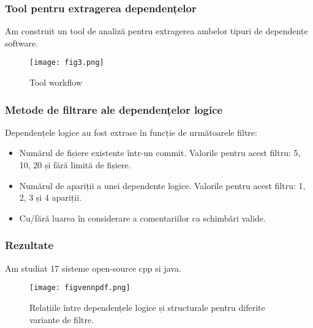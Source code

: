 \documentclass{beamer}
\begin{document}

 \begin{frame}
\frametitle{Tool pentru extragerea dependențelor }
Am construit un tool de analiză pentru extragerea ambelor tipuri de dependențe software.  
\begin{center}
     \begin{figure}
	\texttt{[image: fig3.png]}
	\caption{\label{fig:figtool} Tool workflow}
     \end{figure}
\end{center}

\end{frame}


 \begin{frame}
\frametitle{Metode de filtrare ale dependențelor logice}
Dependențele logice au fost extrase în funcție de următoarele filtre:

\begin{itemize}
\item Numărul de fișiere existente într-un commit. Valorile pentru acest filtru: 5, 10, 20 și fără limită de fișiere.
\item Numărul de apariții a unei dependente logice. Valorile pentru acest filtru: 1, 2, 3 și 4 apariții.
\item Cu/fără luarea în considerare a comentariilor ca schimbări valide.
\end{itemize}

\end{frame}


 \begin{frame}
\frametitle{Rezultate}
Am studiat 17 sisteme open-source cpp si java.
\begin{center}
     \begin{figure}
	\texttt{[image: figvennpdf.png]}
	\caption{\label{fig:figvenn}Relațiile între dependențele logice și structurale pentru diferite variante de filtre. }
     \end{figure}
\end{center}


\end{frame}

\end{document}
